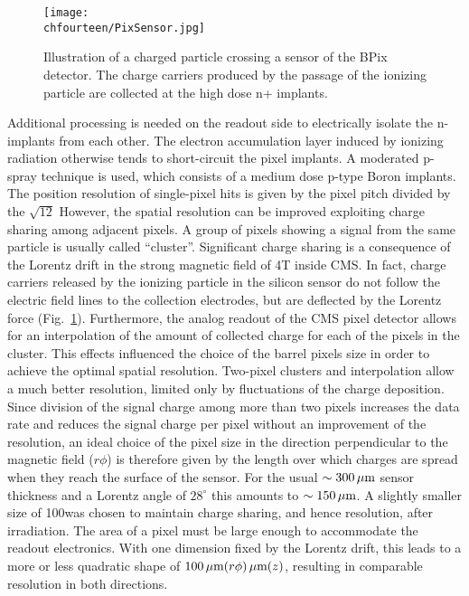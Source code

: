 \begin{figure}[!htb]
 \begin{center}
 \texttt{[image: \\chfourteen/PixSensor.jpg]}
 \end{center}
 \caption{Illustration of a charged particle crossing a sensor of the BPix detector. The charge carriers produced by the passage of the ionizing particle are collected at the high dose n+ implants.}
 \label{fig:PixSensor}
\end{figure}

Additional processing is needed on the readout side to electrically isolate the n-implants from each other.
The electron accumulation layer induced by ionizing radiation otherwise tends to short-circuit the pixel implants.
A moderated p-spray technique is used, which consists of a medium dose p-type Boron implants.\\

The position resolution of single-pixel hits is given by the pixel pitch divided by the $\sqrt{12}$
However, the spatial resolution can be improved exploiting charge sharing among adjacent pixels. A group of pixels showing a signal from the same particle is usually called ``cluster''.
Significant charge sharing is a consequence of the Lorentz drift in the strong magnetic field of 4\unit{T} inside CMS.
In fact, charge carriers released by the ionizing particle in the silicon sensor do not follow the electric field lines to the collection electrodes, but are deflected by the Lorentz force (Fig.~\ref{fig:PixSensor}).
Furthermore, the analog readout of the CMS pixel detector allows for an interpolation of the amount of collected charge for each of the pixels in the cluster.
This effects influenced the choice of the barrel pixels size in order to achieve the optimal spatial resolution.
Two-pixel clusters and interpolation allow a much better resolution, limited only by fluctuations of the charge deposition.
Since division of the signal charge among more than two pixels increases the data rate and reduces the signal charge per pixel without an improvement of the resolution, an ideal choice of the pixel size in the direction perpendicular to the magnetic field ($r\phi$) is therefore given by the length over which charges are spread when they reach the surface of the sensor.
For the usual $\sim300\,\mu\text{m}$ sensor thickness and a Lorentz angle of $28^\circ$ this amounts to $\sim150\,\mu\text{m}$.
A slightly smaller size of 100\mum was chosen to maintain charge sharing, and hence resolution, after irradiation.
The area of a pixel must be large enough to accommodate the readout electronics.
With one dimension fixed by the Lorentz drift, this leads to a more or less quadratic shape of $100\mum(r\phi)\time150\mum(z)$, resulting in comparable resolution in both directions.


